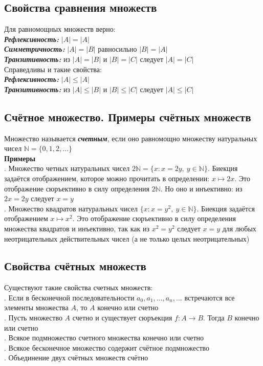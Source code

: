 \documentclass[a4paper]{article}
\begin{document}
\subsection{Свойства сравнения множеств}
Для равномощных множеств верно:\\[2mm]
\indent \textbf{\textit{Рефлексивность:}} $|A|=|A|$\\[2mm]
\indent \textbf{\textit{Симметричность:}} $|A|=|B|$ равносильно $|B|=|A|$\\[2mm]
\indent \textbf{\textit{Транзитивность:}} из $|A|=|B|$ и $|B|=|C|$ следует $|A|=|C|$\\[2mm]
Справедливы и такие свойства:\\[2mm]
\indent \textbf{\textit{Рефлексивность:}} $|A|\leqslant|A|$\\[2mm]
\indent \textbf{\textit{Транзитивность:}} из $|A|\leqslant|B|$ и $|B|\leqslant|C|$ следует $|A|\leqslant|C|$
\subsection{Счётное множество. Примеры счётных множеств}
Множество называется \textbf{\textit{счетным}}, если оно равномощно множеству натуральных чисел $\mathbb{N}=\{0,1,2,\ldots\}$\\[2mm]
\label{sec:1.49}\textbf{Примеры}\\[2mm]
. Множество четных натуральных чисел $2\mathbb{N}=\{x: x=2y,\ y\in\mathbb{N}\}$. Биекция задаётся отображением, которое можно прочитать в определении: $x\mapsto2x$. Это отображение сюръективно в силу определения $2\mathbb{N}$. Но оно и инъективно: из $2x=2y$ следует $x = y$\\[2mm]
. Множество квадратов натуральных чисел $\{x: x=y^2,\ y\in\mathbb{N}\}$. Биекция задаётся отображением $x\mapsto x^2$. Это отображение сюръективно в силу определения множества квадратов и инъективно, так как из $x^2 = y^2$ следует $x = y$ для любых неотрицательных действительных чисел (а не только целых неотрицательных)
\subsection{Свойства счётных множеств}
Существуют такие свойства счетных множеств:\\[2mm]
. Если в бесконечной последовательности $a_0, a_1,\ldots, a_n,\ldots$ встречаются все элементы множества $A$, то $A$ конечно или счетно\\[2mm]
. Пусть множество $A$ счетно и существует сюръекция $f: A\rightarrow B.$ Тогда $B$ конечно или счетно\\[2mm]
. Всякое подмножество счетного множества конечно или счетно\\[2mm]
. Всякое бесконечное множество содержит счётное подмножество\\[2mm]
. Объединение двух счётных множеств счётно
\end{document}
